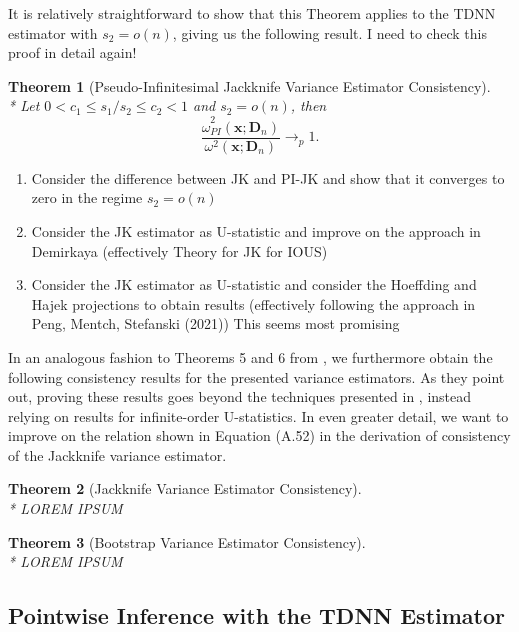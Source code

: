\documentclass[letterpaper,10pt]{article}
\numberwithin{equation}{section}
\newtheorem{thm}{Theorem}
\numberwithin{thm}{section}
\numberwithin{lem}{section}
\numberwithin{cor}{section}
\renewcommand{\hat}{\widehat}
\newcommand{\1}{\mathbbm{1}}
\begin{document}
It is relatively straightforward to show that this Theorem applies to the TDNN estimator with $s_2 = o(n)$, giving us the following result.
	{\color{red} I need to check this proof in detail again!}
\begin{thm}[Pseudo-Infinitesimal Jackknife Variance Estimator Consistency]\label{thm:PI_JK_Cons}\mbox{}\\*
	Let $0 < c_1 \leq s_1/s_2 \leq c_2 < 1$ and $s_2 = o(n)$, then
	\begin{equation}
		\frac{\hat{\omega}_{PI}^2\left(\mathbf{x}; \mathbf{D}_n\right)}{\omega^{2}\left(\mathbf{x}; \mathbf{D}_n\right)} \longrightarrow_{p} 1.
	\end{equation}
\end{thm}

{\color{red}
\begin{enumerate}
	\item Consider the difference between JK and PI-JK and show that it converges to zero in the regime $s_2 = o(n)$
	\item Consider the JK estimator as U-statistic and improve on the approach in Demirkaya
	      (effectively Theory for JK for IOUS)
	\item Consider the JK estimator as U-statistic and consider the Hoeffding and Hajek projections to obtain results
		(effectively following the approach in Peng, Mentch, Stefanski (2021)) 
		This seems most promising
\end{enumerate}

In an analogous fashion to Theorems 5 and 6 from \citet{demirkaya_optimal_2024}, we furthermore obtain the following consistency results for the presented variance estimators.
As they point out, proving these results goes beyond the techniques presented in \citet{arvesen_jackknifing_1969}, instead relying on results for infinite-order U-statistics.
In even greater detail, we want to improve on the relation shown in Equation (A.52) in the derivation of consistency of the Jackknife variance estimator.
\begin{thm}[Jackknife Variance Estimator Consistency]\label{thm:JK_Cons}\mbox{}\\*
	LOREM IPSUM
\end{thm}

\begin{thm}[Bootstrap Variance Estimator Consistency]\label{thm:BS_Cons}\mbox{}\\*
	LOREM IPSUM
\end{thm}
}

\subsection{Pointwise Inference with the TDNN Estimator}
\end{document}
